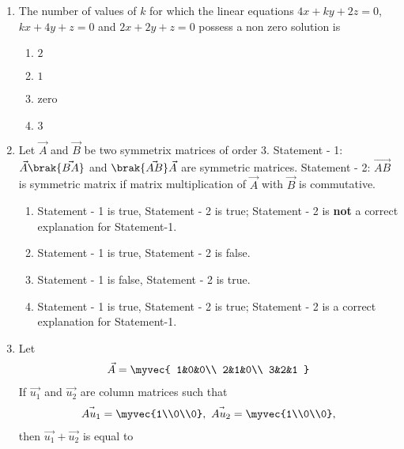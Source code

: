 \begin{enumerate}[label=\thesubsection.\arabic*.,ref=\thesubsection.\theenumi]
    \item The number of values of $k$ for which the linear equations $4x + ky + 2z = 0$, $kx + 4y + z = 0$ and $2x + 2y + z=0$ possess a non zero solution is 
	\hfill {}{\par}
\begin{multicols}{2}
        \begin{enumerate}
                \item $2$
                \item $1$
                \item zero
                \item $3$
        \end{enumerate}
\end{multicols}
%
    \item Let $\vec{A}$ and $\vec{B}$ be two symmetrix matrices of order $3$.
	\newline
	{Statement - 1:} $\vec{A}\brak{\vec{BA}}$ and $\brak{\vec{AB}}\vec{A}$ are symmetric matrices. 
	\newline
	{Statement - 2:} $\vec{AB}$ is symmetric matrix if matrix multiplication of $\vec{A}$ with $\vec{B}$ is commutative.
%
	\begin{enumerate}
		\item Statement - 1 is true, Statement - 2 is true; Statement - 2 is \textbf{not} a correct explanation for Statement-1. 
	    	\item Statement - 1 is true, Statement - 2 is false. 
	    	\item Statement - 1 is false, Statement - 2 is true.
	    	\item Statement - 1 is true, Statement - 2 is true; Statement - 2 is a correct explanation for Statement-1. 
	\end{enumerate}
%
	\item Let \begin{align*}
	\vec{A} = \myvec{ 
		1&0&0\\
		2&1&0\\
		3&2&1
	}
	\end{align*} If $\vec{u_1}$ and $\vec{u_2}$ are column matrices such that
	\begin{align*}
		\vec{Au_1} = \myvec{1\\0\\0},\
		\vec{Au_2} = \myvec{1\\0\\0},
	\end{align*} then $\vec{u_1} + \vec{u_2}$ is equal to

\end{enumerate}
